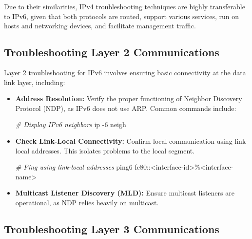 \documentclass[
]{article}
\newenvironment{Shaded}{}{}
\newcommand{\AttributeTok}[1]{\textcolor[rgb]{0.49,0.56,0.16}{#1}}
\newcommand{\CommentTok}[1]{\textcolor[rgb]{0.38,0.63,0.69}{\textit{#1}}}
\newcommand{\ExtensionTok}[1]{#1}
\newcommand{\NormalTok}[1]{#1}
\newcommand{\OperatorTok}[1]{\textcolor[rgb]{0.40,0.40,0.40}{#1}}
\begin{document}
Due to their similarities, IPv4 troubleshooting techniques are highly
transferable to IPv6, given that both protocols are routed, support
various services, run on hosts and networking devices, and facilitate
management traffic.

\subsection{Troubleshooting Layer 2
Communications}\label{troubleshooting-layer-2-communications}

Layer 2 troubleshooting for IPv6 involves ensuring basic connectivity at
the data link layer, including:

\begin{itemize}
\item
  \textbf{Address Resolution:} Verify the proper functioning of Neighbor
  Discovery Protocol (NDP), as IPv6 does not use ARP. Common commands
  include:

\begin{Shaded}
\begin{Highlighting}[]
\CommentTok{\# Display IPv6 neighbors}
\ExtensionTok{ip} \AttributeTok{{-}6}\NormalTok{ neigh}
\end{Highlighting}
\end{Shaded}
\item
  \textbf{Check Link-Local Connectivity:} Confirm local communication
  using link-local addresses. This isolates problems to the local
  segment.

\begin{Shaded}
\begin{Highlighting}[]
\CommentTok{\# Ping using link{-}local addresses}
\ExtensionTok{ping6}\NormalTok{ fe80::}\OperatorTok{\textless{}}\NormalTok{interface{-}id}\OperatorTok{\textgreater{}}\NormalTok{\%}\OperatorTok{\textless{}}\NormalTok{interface{-}name}\OperatorTok{\textgreater{}}
\end{Highlighting}
\end{Shaded}
\item
  \textbf{Multicast Listener Discovery (MLD):} Ensure multicast
  listeners are operational, as NDP relies heavily on multicast.
\end{itemize}

\subsection{Troubleshooting Layer 3
Communications}\label{troubleshooting-layer-3-communications}
\end{document}
